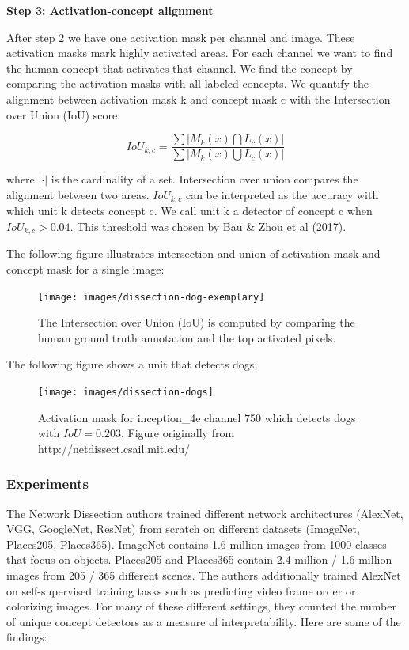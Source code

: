 \documentclass[
  10pt,
]{scrbook}
\begin{document}
\textbf{Step 3: Activation-concept alignment}

After step 2 we have one activation mask per channel and image.
These activation masks mark highly activated areas.
For each channel we want to find the human concept that activates that channel.
We find the concept by comparing the activation masks with all labeled concepts.
We quantify the alignment between activation mask k and concept mask c with the Intersection over Union (IoU) score:

\[IoU_{k,c}=\frac{\sum|M_k(x)\bigcap{}L_c(x)|}{\sum|M_k(x)\bigcup{}L_c(x)|}\]

where \(|\cdot|\) is the cardinality of a set.
Intersection over union compares the alignment between two areas.
\(IoU_{k,c}\) can be interpreted as the accuracy with which unit k detects concept c.
We call unit k a detector of concept c when \(IoU_{k,c}>0.04\).
This threshold was chosen by Bau \& Zhou et al (2017).

The following figure illustrates intersection and union of activation mask and concept mask for a single image:

\begin{figure}

{\centering \texttt{[image: images/dissection-dog-exemplary]} 

}

\caption{The Intersection over Union (IoU) is computed by comparing the human ground truth annotation and the top activated pixels.}\label{fig:unnamed-chunk-55}
\end{figure}

The following figure shows a unit that detects dogs:

\begin{figure}

{\centering \texttt{[image: images/dissection-dogs]} 

}

\caption{Activation mask for inception\_4e channel 750 which detects dogs with $IoU=0.203$. Figure originally from http://netdissect.csail.mit.edu/}\label{fig:unnamed-chunk-56}
\end{figure}

\hypertarget{experiments}{%
\subsubsection{Experiments}\label{experiments}}

The Network Dissection authors trained different network architectures (AlexNet, VGG, GoogleNet, ResNet) from scratch on different datasets (ImageNet, Places205, Places365).
ImageNet contains 1.6 million images from 1000 classes that focus on objects.
Places205 and Places365 contain 2.4 million / 1.6 million images from 205 / 365 different scenes.
The authors additionally trained AlexNet on self-supervised training tasks such as predicting video frame order or colorizing images.
For many of these different settings, they counted the number of unique concept detectors as a measure of interpretability.
Here are some of the findings:
\end{document}
